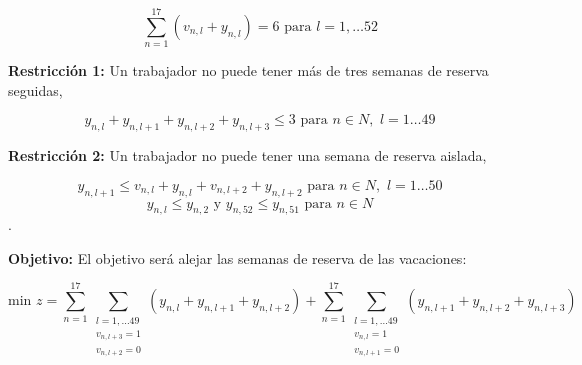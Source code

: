 \documentclass[a4paper,12pt]{article}
\begin{document}
$$ \sum_{n=1}^{17} (v_{n,l} + y_{n,l}) = 6 \text{ para } l = 1,\dots 52$$

\textbf{Restricci\'on 1:} Un trabajador no puede tener m\'as de tres semanas de reserva seguidas,

$$ y_{n,l} + y_{n,l+1} + y_{n,l+2} + y_{n,l+3} \leq 3 \text{ para } n\in N, \,\,l=1\dots 49$$

\textbf{Restricci\'on 2:} Un trabajador no puede tener una semana de reserva aislada,

$$ y_{n,l+1} \leq v_{n,l} + y_{n,l} + v_{n,l+2} + y_{n,l+2} \text{ para } n\in N,\,\,l = 1\dots 50$$
$$ y_{n,l} \leq y_{n,2} \text{ y } y_{n,52} \leq y_{n,51} \text{ para } n\in N$$.

\textbf{Objetivo:} El objetivo ser\'a alejar las semanas de reserva de las vacaciones:

$$ \text{min } z = \sum_{n=1}^{17}{ \sum_{\substack{l=1,\dots 49\\ v_{n,l+3}=1\\ v_{n,l+2}=0}}{(y_{n,l} + y_{n,l+1} + y_{n,l+2})} } + 
				   \sum_{n=1}^{17}{ \sum_{\substack{l=1,\dots 49\\ v_{n,l}=1\\ v_{n,l+1}=0}}{(y_{n,l+1} + y_{n,l+2} + y_{n,l+3})} } $$
\end{document}
